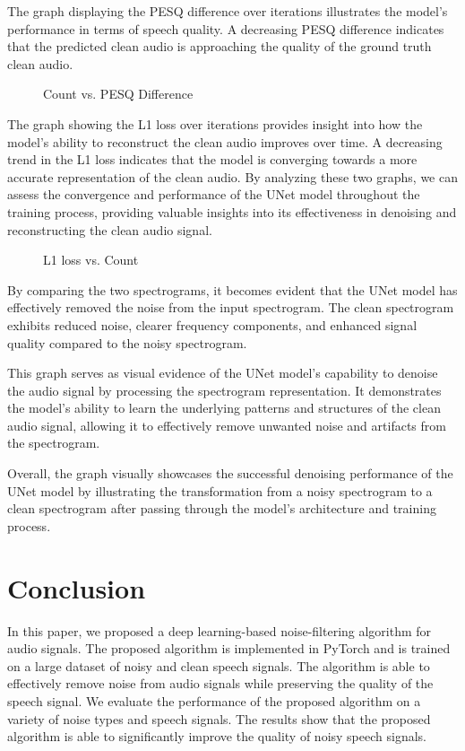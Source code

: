 \documentclass[conference]{IEEEtran}
\begin{document}
The graph displaying the PESQ difference over iterations illustrates the model's performance in terms of speech quality. A decreasing PESQ difference indicates that the predicted clean audio is approaching the quality of the ground truth clean audio.

\begin{figure}[t!]
    \centering
    
    \caption{Count vs. PESQ Difference}
    \label{fig:my_label}
\end{figure}

The graph showing the L1 loss over iterations provides insight into how the model's ability to reconstruct the clean audio improves over time. A decreasing trend in the L1 loss indicates that the model is converging towards a more accurate representation of the clean audio. By analyzing these two graphs, we can assess the convergence and performance of the UNet model throughout the training process, providing valuable insights into its effectiveness in denoising and reconstructing the clean audio signal.

\begin{figure}[t!]
    \centering
    
    \caption{L1 loss vs. Count}
    \label{fig:my_label}
\end{figure}

By comparing the two spectrograms, it becomes evident that the UNet model has effectively removed the noise from the input spectrogram. The clean spectrogram exhibits reduced noise, clearer frequency components, and enhanced signal quality compared to the noisy spectrogram.

This graph serves as visual evidence of the UNet model's capability to denoise the audio signal by processing the spectrogram representation. It demonstrates the model's ability to learn the underlying patterns and structures of the clean audio signal, allowing it to effectively remove unwanted noise and artifacts from the spectrogram.

Overall, the graph visually showcases the successful denoising performance of the UNet model by illustrating the transformation from a noisy spectrogram to a clean spectrogram after passing through the model's architecture and training process.

\section{Conclusion}
In this paper, we proposed a deep learning-based noise-filtering algorithm for audio signals. The proposed algorithm is implemented in PyTorch and is trained on a large dataset of noisy and clean speech signals. The algorithm is able to effectively remove noise from audio signals while preserving the quality of the speech signal. We evaluate the performance of the proposed algorithm on a variety of noise types and speech signals. The results show that the proposed algorithm is able to significantly improve the quality of noisy speech signals.
\end{document}
